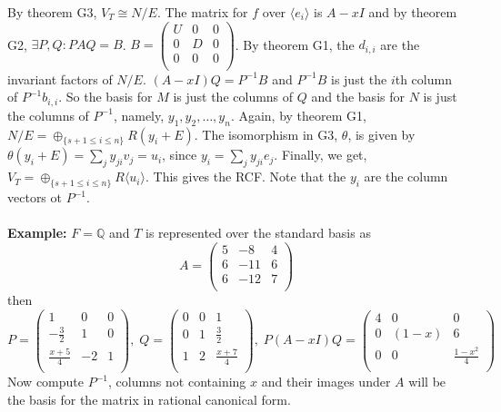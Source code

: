By theorem G3, $V_T \cong N/E$.  The matrix for $f$ over $\langle e_i \rangle$ 
is $A-xI$ and by theorem G2, $\exists P, Q: PAQ=B$.
$B= 
\left(
\begin{array}{ccc}
U & 0 & 0\\
0 & D & 0\\
0 & 0 & 0\\
\end{array}
\right) $.  By theorem G1, the $d_{i,i}$ are the invariant factors of $N/E$.  $(A-xI)Q = P^{-1}B$ and
$P^{-1}B$ is just the $i$th column of $P^{-1} b_{i,i}$.
So the basis for $M$ is just the columns of $Q$ and the basis for $N$ is just the columns of $P^{-1}$, namely,
$y_1, y_2 , \ldots , y_n$.  Again, by theorem G1, $N/E = \oplus_{\{s+1 \leq i \leq n\}} R(y_i + E)$.
The isomorphism in G3, $\theta$, is given by $\theta(y_i + E) = \sum_j y_{ji}v_j = u_i$, since
$y_i = \sum_j y_{ji}e_j$.  Finally, we get,
$V_T= \oplus_{\{s+1 \leq i \leq n\}} R\langle u_i \rangle$.  This gives the RCF.  Note that the $y_i$ are the
column vectors ot $P^{-1}$.
\\
\\
{\bf Example:} $F = \mathbb{Q}$ and $T$ is represented over the standard basis as
$$
A =
\left(
\begin{array}{ccc}
5 & -8 & 4\\
6 & -11& 6\\
6 & -12& 7\\
\end{array}
\right)
$$
then
$$
P =
\left(
\begin{array}{ccc}
1 & 0 & 0\\
-{\frac 3 2} & 1 & 0\\
{\frac {x+5} 4} & -2& 1\\
\end{array}
\right),\;
Q =
\left(
\begin{array}{ccc}
0 & 0 & 1\\
0 & 1& {\frac 3 2}\\
1 & 2& {\frac {x+7} 4}\\
\end{array}
\right),\;
P(A-xI)Q =
\left(
\begin{array}{ccc}
4 & 0 & 0\\
0 & (1-x) & 6\\
0 & 0& {\frac {1-x^2} 4} \\
\end{array}
\right)
$$
Now compute $P^{-1}$, columns not containing $x$ and their images under $A$ will be the basis for the matrix in rational canonical form.

